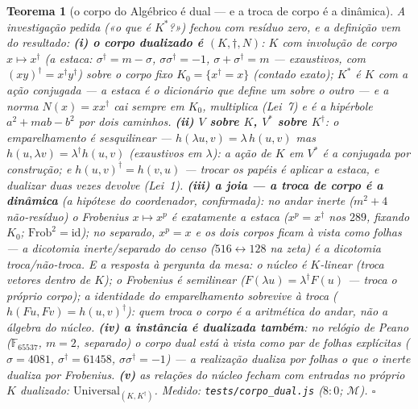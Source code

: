 \documentclass[11pt,a4paper]{article}
\newtheorem{teorema}{Teorema}
\newcommand{\code}[1]{\texttt{\small #1}}
\begin{document}
\begin{teorema}[o corpo do Algébrico é dual --- e a troca de corpo é
a dinâmica]\label{thm:corpo-dual}
A investigação pedida («o que é $K^{*}$?») fechou com resíduo zero, e
a definição \emph{vem do resultado}:
\textbf{(i) o corpo dualizado é $(K,\dagger,N)$}: $K$ com involução
de corpo $x\mapsto x^{\dagger}$ (a estaca: $\sigma^{\dagger}=m-\sigma$,
$\sigma\sigma^{\dagger}=-1$, $\sigma+\sigma^{\dagger}=m$ ---
exaustivos, com $(xy)^{\dagger}=x^{\dagger}y^{\dagger}$) sobre o
corpo fixo $K_{0}=\{x^{\dagger}=x\}$ (contado exato); $K^{*}$ \emph{é}
$K$ com a ação conjugada --- a estaca é o dicionário que define um
sobre o outro --- e a norma $N(x)=x x^{\dagger}$ cai \emph{sempre}
em $K_{0}$, multiplica (Lei~7) e é a hipérbole $a^{2}+mab-b^{2}$ por
dois caminhos.
\textbf{(ii) $V$ sobre $K$, $V^{*}$ sobre $K^{\dagger}$}: o
emparelhamento é \emph{sesquilinear} --- $h(\lambda u,v)=\lambda\,
h(u,v)$ mas $h(u,\lambda v)=\lambda^{\dagger}h(u,v)$ (exaustivos em
$\lambda$): a ação de $K$ em $V^{*}$ é a conjugada \emph{por
construção}; e $h(u,v)^{\dagger}=h(v,u)$ --- trocar os papéis é
aplicar a estaca, e dualizar duas vezes devolve (Lei~1).
\textbf{(iii) a joia --- a troca de corpo é a dinâmica} (a hipótese
do coordenador, confirmada): no andar \emph{inerte} ($m^{2}{+}4$
não-resíduo) o Frobenius $x\mapsto x^{p}$ é \emph{exatamente} a
estaca ($x^{p}=x^{\dagger}$ nos $289$, fixando $K_{0}$;
$\mathrm{Frob}^{2}=\mathrm{id}$); no \emph{separado}, $x^{p}=x$ e os
dois corpos ficam \emph{à vista} como folhas --- a dicotomia
inerte/separado do censo ($516\leftrightarrow128$ na zeta) é a
dicotomia troca/não-troca. E a resposta à pergunta da mesa: o
\emph{núcleo} é $K$-linear (troca vetores \emph{dentro} de $K$); o
\emph{Frobenius} é semilinear ($F(\lambda u)=\lambda^{\dagger}F(u)$
--- troca o próprio corpo); a identidade do emparelhamento
\emph{sobrevive} à troca ($h(Fu,Fv)=h(u,v)^{\dagger}$): \emph{quem
troca o corpo é a aritmética do andar, não a álgebra do núcleo}.
\textbf{(iv) a instância é dualizada também}: no relógio de Peano
($\mathbb{F}_{65537}$, $m{=}2$, separado) o corpo dual está à vista
como par de folhas explícitas ($\sigma=4081$,
$\sigma^{\dagger}=61458$, $\sigma\sigma^{\dagger}=-1$) --- a
realização dualiza por folhas o que o inerte dualiza por Frobenius.
\textbf{(v)} as relações do núcleo fecham com entradas no próprio
$K$ dualizado: $\mathrm{Universal}_{(K,K^{\dagger})}$.
\emph{Medido:} \code{tests/corpo\_dual.js} ($8{:}0$; $\mathcal{M}$).
$\square$
\end{teorema}
\end{document}

